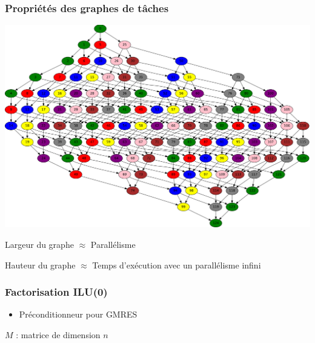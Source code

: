 \documentclass{beamer}
\begin{document}
\begin{frame}
  \frametitle{Propriétés des graphes de tâches}


  \centerline{\includegraphics[width=0.8\linewidth]{graphe_exemple}}


  Largeur du graphe $\approx$ Parallélisme


  Hauteur du graphe $\approx$ Temps d'exécution avec un parallélisme infini
\end{frame}


\begin{frame}
  \frametitle{Factorisation ILU(0)}

  \begin{itemize}
    \item Préconditionneur pour GMRES
  \end{itemize}

\begin{algorithm}[H]
\begin{algorithmic}[1]
  \STATE $M$ : matrice de dimension $n$
  \ENDFOR
\end{algorithmic}
\end{algorithm}

\end{frame}
\end{document}
